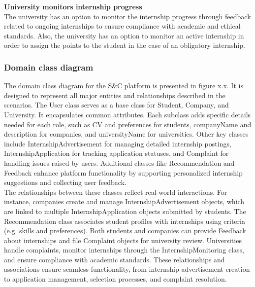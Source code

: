 \textbf{University monitors internship progress}\\
The university has an option to monitor the internship progress through feedback related to ongoing internships to ensure compliance with academic and ethical standards. Also, the university has an option to monitor an active internship in order to assign the points to the student in the case of an obligatory internship. \\




\subsubsection{Domain class diagram}

The domain class diagram for the S\&C platform is presented in figure x.x. It is designed to represent all major entities and relationships described in the scenarios. The User class serves as a base class for Student, Company, and University. It encapsulates common attributes. Each subclass adds specific details needed for each role, such as CV and preferences for students, companyName and description for companies, and universityName for universities. Other key classes include InternshipAdvertisement for managing detailed internship postings, InternshipApplication for tracking application statuses, and Complaint for handling issues raised by users. Additional classes like Recommendation and Feedback enhance platform functionality by supporting personalized internship suggestions and collecting user feedback. \\

The relationships between these classes reflect real-world interactions. For instance, companies create and manage InternshipAdvertisement objects, which are linked to multiple InternshipApplication objects submitted by students. The Recommendation class associates student profiles with internships using criteria (e.g. skills and preferences). Both students and companies can provide Feedback about internships and file Complaint objects for university review. Universities handle complaints, monitor internships through the InternshipMonitoring class, and ensure compliance with academic standards. These relationships and associations ensure seamless functionality, from internship advertisement creation to application management, selection processes, and complaint resolution. \\

